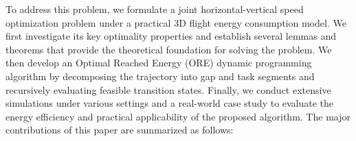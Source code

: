 To address this problem, we formulate a joint horizontal-vertical speed optimization problem under a practical 3D flight energy consumption model.
We first investigate its key optimality properties and establish several lemmas and theorems that provide the theoretical foundation for solving the problem.
We then develop an Optimal Reached Energy (ORE) dynamic programming algorithm by decomposing the trajectory into gap and task segments and recursively evaluating feasible transition states.
Finally, we conduct extensive simulations under various settings and a real-world case study to evaluate the energy efficiency and practical applicability of the proposed algorithm.
The major contributions of this paper are summarized as follows:


